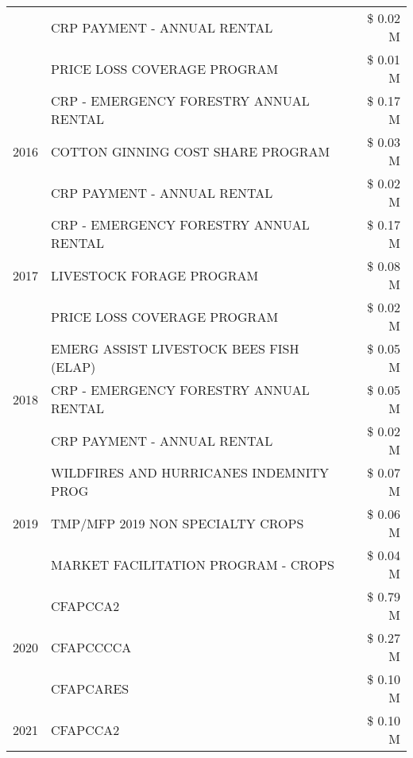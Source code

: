 \begin{tabular}{llr}
 & CRP PAYMENT - ANNUAL RENTAL & \$ 0.02 M \\
 & PRICE LOSS COVERAGE PROGRAM & \$ 0.01 M \\
\cline{1-3}
\multirow[t]{3}{*}{2016} & CRP - EMERGENCY FORESTRY ANNUAL RENTAL & \$ 0.17 M \\
 & COTTON GINNING COST SHARE PROGRAM & \$ 0.03 M \\
 & CRP PAYMENT - ANNUAL RENTAL & \$ 0.02 M \\
\cline{1-3}
\multirow[t]{3}{*}{2017} & CRP - EMERGENCY FORESTRY ANNUAL RENTAL & \$ 0.17 M \\
 & LIVESTOCK FORAGE PROGRAM & \$ 0.08 M \\
 & PRICE LOSS COVERAGE PROGRAM & \$ 0.02 M \\
\cline{1-3}
\multirow[t]{3}{*}{2018} & EMERG ASSIST LIVESTOCK BEES FISH (ELAP) & \$ 0.05 M \\
 & CRP - EMERGENCY FORESTRY ANNUAL RENTAL & \$ 0.05 M \\
 & CRP PAYMENT - ANNUAL RENTAL & \$ 0.02 M \\
\cline{1-3}
\multirow[t]{3}{*}{2019} & WILDFIRES AND HURRICANES INDEMNITY PROG & \$ 0.07 M \\
 & TMP/MFP 2019 NON SPECIALTY CROPS & \$ 0.06 M \\
 & MARKET FACILITATION PROGRAM - CROPS & \$ 0.04 M \\
\cline{1-3}
\multirow[t]{3}{*}{2020} & CFAPCCA2 & \$ 0.79 M \\
 & CFAPCCCCA & \$ 0.27 M \\
 & CFAPCARES & \$ 0.10 M \\
\cline{1-3}
2021 & CFAPCCA2 & \$ 0.10 M \\
\cline{1-3}
\bottomrule
\end{tabular}
